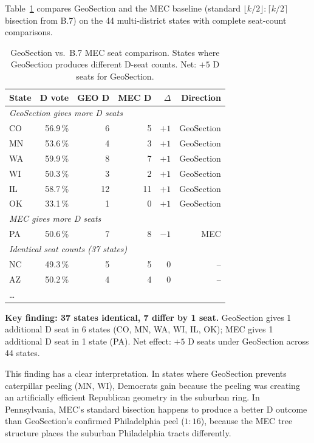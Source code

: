 Table~\ref{tab:head-to-head} compares GeoSection and the MEC baseline
(standard $\lfloor k/2\rfloor:\lceil k/2\rceil$ bisection from B.7)
on the 44 multi-district states with complete seat-count comparisons.

\begin{table}[h]
\centering
\caption{GeoSection vs.\ B.7 MEC seat comparison.
  States where GeoSection produces different D-seat counts.
  Net: $+5$ D seats for GeoSection.}
\label{tab:head-to-head}
\begin{tabular}{lrrrrr}
\toprule
State & D vote & GEO D & MEC D & $\Delta$ & Direction \\
\midrule
\multicolumn{6}{l}{\textit{GeoSection gives more D seats}} \\
CO  & 56.9\,\% & 6 & 5 & $+1$ & GeoSection \\
MN  & 53.6\,\% & 4 & 3 & $+1$ & GeoSection \\
WA  & 59.9\,\% & 8 & 7 & $+1$ & GeoSection \\
WI  & 50.3\,\% & 3 & 2 & $+1$ & GeoSection \\
IL  & 58.7\,\% & 12 & 11 & $+1$ & GeoSection \\
OK  & 33.1\,\% & 1 & 0 & $+1$ & GeoSection \\
\midrule
\multicolumn{6}{l}{\textit{MEC gives more D seats}} \\
PA  & 50.6\,\% & 7 & 8 & $-1$ & MEC \\
\midrule
\multicolumn{6}{l}{\textit{Identical seat counts (37 states)}} \\
NC  & 49.3\,\% & 5 & 5 & 0 & -- \\
AZ  & 50.2\,\% & 4 & 4 & 0 & -- \\
\ldots & & & & & \\
\bottomrule
\end{tabular}
\end{table}

\noindent\textbf{Key finding: 37 states identical, 7 differ by 1 seat.}
GeoSection gives 1 additional D seat in 6 states (CO, MN, WA, WI, IL, OK);
MEC gives 1 additional D seat in 1 state (PA).
Net effect: $+5$ D seats under GeoSection across 44 states.

This finding has a clear interpretation.
In states where GeoSection prevents caterpillar peeling (MN, WI), Democrats
gain because the peeling was creating an artificially efficient Republican
geometry in the suburban ring.
In Pennsylvania, MEC's standard bisection happens to produce a better D outcome
than GeoSection's confirmed Philadelphia peel ($1:16$), because the MEC tree
structure places the suburban Philadelphia tracts differently.

